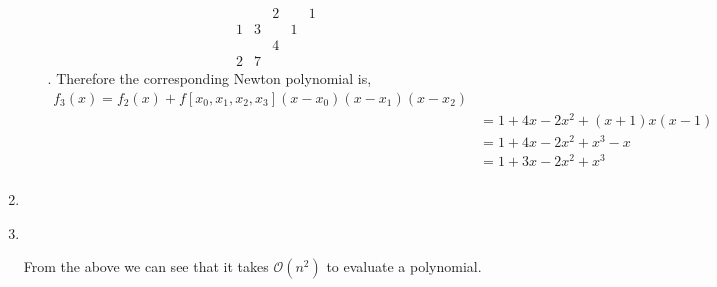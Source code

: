 \documentclass{report}
\begin{document}
\begin{solution}
\begin{enumerate}[label=(\alph*)]
\begin{enumerate}[label=(\roman*)]
\[\begin{array}{c|cccc}
					               &        & 2               &                         & 1                               \\
					            1  & 3      &                 & 1                       &                                 \\
					               &        & 4               &                         &                                 \\
					            2  & 7      &                 &                         &
				            \end{array}
			            \].
			            Therefore the corresponding Newton polynomial is,
			            \begin{align*}
				            f_3(x)= f_2(x) + f[x_0,x_1,x_2,x_3](x-x_0)(x-x_1)(x-x_2) \\
				             & = 1 + 4x -2x^2 + (x+1)x(x-1) \\
				             & = 1 + 4x -2x^2 + x^3 -x \\
				             & = 1 + 3x -2x^2 + x^3 \\
			            \end{align*}
		      \end{enumerate}
		\item
		\item 	\phantom{}\\
		      \begin{algorithm}[H]
		      \end{algorithm}
		      From the above we can see that it takes $\mathcal{O}\left( n^2 \right) $ to evaluate a polynomial.
	\end{enumerate}
\end{solution}
\end{document}
